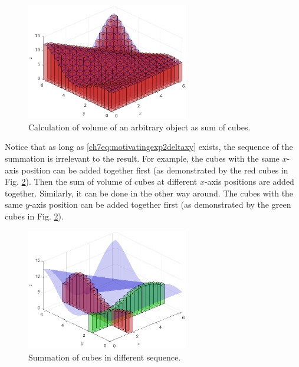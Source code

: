 \begin{figure}
	\centering
	\includegraphics[width=200pt]{chapters/chapter7/figures/motivatingexp2p2.eps}
	\caption{Calculation of volume of an arbitrary object as sum of cubes.} \label{ch7fig:motivatingexp2p2}
\end{figure}

Notice that as long as \eqref{ch7eq:motivatingexp2deltaxy} exists, the sequence of the summation is irrelevant to the result. For example, the cubes with the same $x$-axis position can be added together first (as demonstrated by the red cubes in Fig. \ref{ch7fig:motivatingexp2p3}). Then the sum of volume of cubes at different $x$-axis positions are added together. Similarly, it can be done in the other way around. The cubes with the same $y$-axis position can be added together first (as demonstrated by the green cubes in Fig. \ref{ch7fig:motivatingexp2p3}).

\begin{figure}
	\centering
	\includegraphics[width=200pt]{chapters/chapter7/figures/motivatingexp2p3.eps}
	\caption{Summation of cubes in different sequence.} \label{ch7fig:motivatingexp2p3}
\end{figure}

